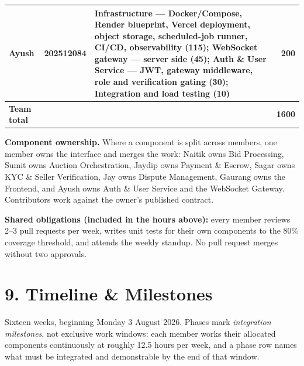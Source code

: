 \documentclass[11pt, a4paper]{article}
\newcommand{\secgap}{\vspace{0.06in}}
\begin{document}
{\begin{longtable}{@{}l l p{2.8in} r@{}}
\addlinespace
Ayush & 202512084 & Infrastructure --- Docker/Compose, Render blueprint, Vercel deployment, object storage, scheduled-job runner, CI/CD, observability (115); WebSocket gateway --- server side (45); Auth \& User Service --- JWT, gateway middleware, role and verification gating (30); Integration and load testing (10) & 200 \\
\midrule
\textbf{Team total} & & & \textbf{1600} \\
\bottomrule
\end{longtable}
}

\medskip
\noindent\textbf{Component ownership.} Where a component is split across members, one
member owns the interface and merges the work: Naitik owns Bid Processing, Sumit owns
Auction Orchestration, Jaydip owns Payment \& Escrow, Sagar owns KYC \& Seller
Verification, Jay owns Dispute Management, Gaurang owns the Frontend, and Ayush owns Auth
\& User Service and the WebSocket Gateway. Contributors work against the owner's published
contract.

\medskip
\noindent\textbf{Shared obligations (included in the hours above):} every member reviews
2--3 pull requests per week, writes unit tests for their own components to the 80\% coverage
threshold, and attends the weekly standup. No pull request merges without two approvals.

\secgap
\section*{9. Timeline \& Milestones}

Sixteen weeks, beginning Monday 3 August 2026. Phases mark \emph{integration milestones},
not exclusive work windows: each member works their allocated components continuously at
roughly 12.5 hours per week, and a phase row names what must be integrated and
demonstrable by the end of that window.
\end{document}
